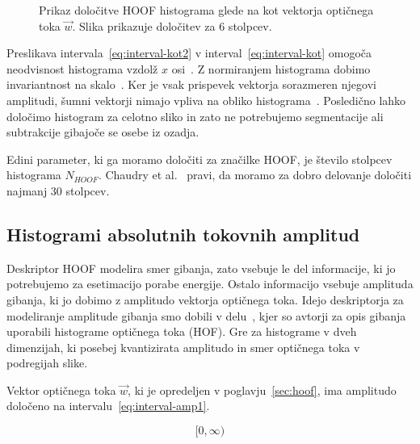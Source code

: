\begin{figure}[htb]
\centering
\resizebox{0.5\columnwidth}{!}{}
\caption[Prikaz določitve histograma HOOF glede na kot vektorja]{Prikaz določitve HOOF histograma glede na kot vektorja optičnega toka $\vec{w}$. Slika prikazuje določitev za $6$ stolpcev.}
\label{fig:hoof-histogram}
\end{figure}




Preslikava intervala~\eqref{eq:interval-kot2} v interval~\eqref{eq:interval-kot} omogoča neodvisnost histograma vzdolž $x$ osi~\cite{chaudhry2009histograms}. Z normiranjem histograma dobimo invariantnost na skalo~\cite{chaudhry2009histograms}. Ker je vsak prispevek vektorja sorazmeren njegovi amplitudi, šumni vektorji nimajo vpliva na obliko histograma~\cite{chaudhry2009histograms}. Posledično lahko določimo histogram za celotno sliko in zato ne potrebujemo segmentacije ali subtrakcije gibajoče se osebe iz ozadja. 

Edini parameter, ki ga moramo določiti za značilke HOOF, je število stolpcev histograma $N_{HOOF}$. Chaudry et al.~\cite{chaudhry2009histograms} pravi, da moramo za dobro delovanje določiti najmanj $30$ stolpcev. 







\subsection{Histogrami absolutnih tokovnih amplitud}\label{sec:hafa}
Deskriptor HOOF modelira smer gibanja, zato vsebuje le del informacije, ki jo potrebujemo za esetimacijo porabe energije. Ostalo informacijo vsebuje amplituda gibanja, ki jo dobimo z amplitudo vektorja optičnega toka. Idejo deskriptorja za modeliranje amplitude gibanja smo dobili v delu~\cite{pers2010histograms}, kjer so avtorji za opis gibanja uporabili histograme optičnega toka (HOF). Gre za histograme v dveh dimenzijah, ki posebej kvantizirata amplitudo in smer optičnega toka v podregijah slike. 

Vektor optičnega toka $\vec{w}$, ki je opredeljen v poglavju~\ref{sec:hoof}, ima amplitudo določeno na intervalu~\eqref{eq:interval-amp1}. 

\begin{equation}\label{eq:interval-amp1}
	[0, \infty)
\end{equation}


